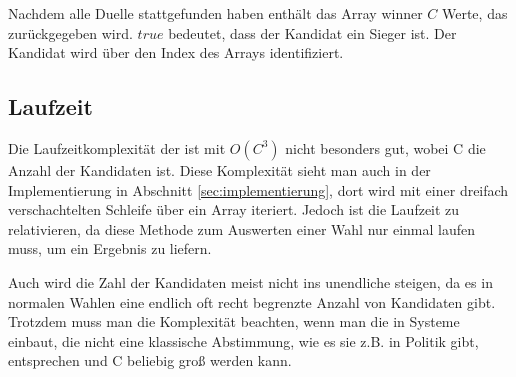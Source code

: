 Nachdem alle Duelle stattgefunden haben enthält das Array winner $C$ Werte, das zurückgegeben wird. $true$ bedeutet, dass der Kandidat ein Sieger ist. Der Kandidat wird über den Index des Arrays identifiziert.




\subsection{Laufzeit}
\label{sec:Laufzeit}
Die Laufzeitkomplexität der \schulze ist mit $O(C^3)$ nicht besonders gut, wobei C die Anzahl der Kandidaten ist. Diese Komplexität sieht man auch in der Implementierung in Abschnitt \ref{sec:implementierung}, dort wird mit einer dreifach verschachtelten Schleife über ein Array iteriert. Jedoch ist die Laufzeit zu relativieren, da diese Methode zum Auswerten einer Wahl nur einmal laufen muss, um ein Ergebnis zu liefern.

Auch wird die Zahl der Kandidaten meist nicht ins unendliche steigen, da es in normalen Wahlen eine endlich oft recht begrenzte Anzahl von Kandidaten gibt. Trotzdem muss man die Komplexität beachten, wenn man die \schulze in Systeme einbaut, die nicht eine klassische Abstimmung, wie es sie z.B. in Politik gibt, entsprechen und C beliebig groß werden kann.


